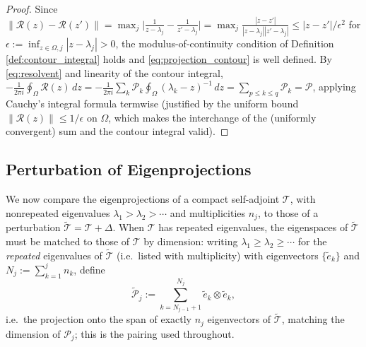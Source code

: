 \begin{proof}
Since $\|\mathcal{R}(z)-\mathcal{R}(z')\| = \max_j\big|\frac{1}{z-\lambda_j}
-\frac{1}{z'-\lambda_j}\big| = \max_j\frac{|z-z'|}{|z-\lambda_j||z'-
\lambda_j|} \leq |z-z'|/\epsilon^2$ for $\epsilon:=\inf_{z\in\Omega,j}
|z-\lambda_j|>0$, the modulus-of-continuity condition of Definition
\ref{def:contour_integral} holds and \eqref{eq:projection_contour} is
well defined. By \eqref{eq:resolvent} and linearity of the contour
integral, $-\frac{1}{2\pi i}\oint_\Omega\mathcal{R}(z)\,dz = -\frac{1}
{2\pi i}\sum_k\mathcal{P}_k\oint_\Omega(\lambda_k-z)^{-1}\,dz =
\sum_{p\leq k\leq q}\mathcal{P}_k = \mathcal{P}$, applying Cauchy's
integral formula termwise (justified by the uniform bound $\|\mathcal{R}
(z)\|\leq 1/\epsilon$ on $\Omega$, which makes the interchange of the
(uniformly convergent) sum and the contour integral valid).
\end{proof}

\subsection{Perturbation of Eigenprojections}
\label{subsec:eigenprojection_perturbation}

We now compare the eigenprojections of a compact self-adjoint
$\mathcal{T}$, with nonrepeated eigenvalues $\lambda_1>\lambda_2>\cdots$
and multiplicities $n_j$, to those of a perturbation
$\widetilde{\mathcal{T}}=\mathcal{T}+\Delta$. When $\mathcal{T}$ has
repeated eigenvalues, the eigenspaces of $\widetilde{\mathcal{T}}$ must be
matched to those of $\mathcal{T}$ by dimension: writing $\lambda_1\geq
\lambda_2\geq\cdots$ for the \emph{repeated} eigenvalues of
$\widetilde{\mathcal{T}}$ (i.e.\ listed with multiplicity) with
eigenvectors $\{\widetilde{e}_k\}$ and $N_j:=\sum_{k=1}^jn_k$, define
\begin{equation}
\widetilde{\mathcal{P}}_j := \sum_{k=N_{j-1}+1}^{N_j}\widetilde{e}_k
\otimes\widetilde{e}_k,
\label{eq:matched_projection}
\end{equation}
i.e.\ the projection onto the span of exactly $n_j$ eigenvectors of
$\widetilde{\mathcal{T}}$, matching the dimension of $\mathcal{P}_j$; this
is the pairing used throughout.

